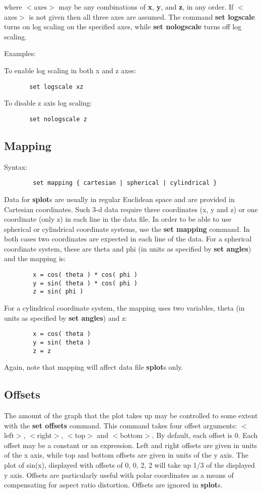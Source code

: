 where $<$axes$>$ may be any combinations of {\bf x}, {\bf y}, and {\bf z}, in any
order.  If $<$axes$>$ is not given then all three axes are assumed.  The
command {\bf set logscale} turns on log scaling on the specified axes,
while {\bf set nologscale} turns off log scaling.

Examples:

To enable log scaling in both x and z axes:
\begin{verbatim}
       set logscale xz
\end{verbatim}
To disable z axis log scaling:
\begin{verbatim}
       set nologscale z
\end{verbatim}
\subsection{Mapping}

Syntax:
\begin{verbatim}
        set mapping { cartesian | spherical | cylindrical }
\end{verbatim}

Data for {\bf splot}s are usually in regular Euclidean space and are
provided in Cartesian coordinates. Such 3-d data require three
coordinates (x, y and z) or one coordinate (only z) in each line in
the data file.  In order to be able to use spherical or cylindrical
coordinate systems, use the {\bf set mapping} command. In both cases two
coordinates are expected in each line of the data. For a spherical
coordinate system, these are theta and phi (in units as specified by
{\bf set angles}) and the mapping is:

\begin{verbatim}
        x = cos( theta ) * cos( phi )
        y = sin( theta ) * cos( phi )
        z = sin( phi )
\end{verbatim}

For a cylindrical coordinate system, the mapping uses two variables,
theta (in units as specified by {\bf set angles}) and z:

\begin{verbatim}
        x = cos( theta )
        y = sin( theta )
        z = z
\end{verbatim}

Again, note that mapping will affect data file {\bf splot}s only.
\subsection{Offsets}
The amount of the graph that the plot takes up may be controlled to
some extent with the {\bf set offsets} command. This command takes four
offset arguments: $<$left$>$, $<$right$>$, $<$top$>$ and $<$bottom$>$. By default,
each offset is 0. Each offset may be a constant or an expression. Left
and right offsets are given in units of the x axis, while top and
bottom offsets are given in units of the y axis. The plot of sin(x),
displayed with offsets of 0, 0, 2, 2 will take up 1/3 of the
displayed y axis. Offsets are particularly useful with polar
coordinates as a means of compensating for aspect ratio distortion.
Offsets are ignored in {\bf splot}s.

